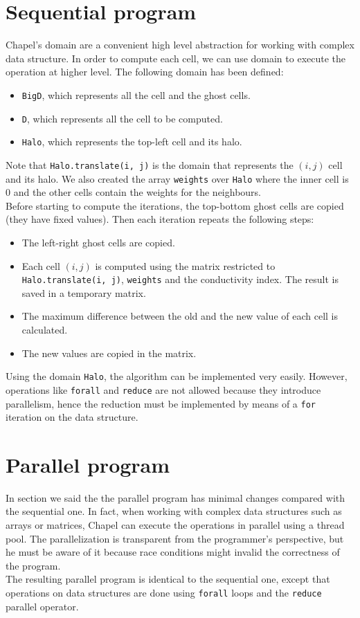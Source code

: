 \documentclass{article}
\begin{document}
\section{Sequential program}
Chapel's domain are a convenient high level abstraction for working with complex data structure. In order to compute each cell, we can use domain to execute the operation at higher level. The following domain has been defined:
\begin{itemize}
    \item \texttt{BigD}, which represents all the cell and the ghost cells.
    \item \texttt{D}, which represents all the cell to be computed.
    \item \texttt{Halo}, which represents the top-left cell and its halo.
\end{itemize}
Note that \texttt{Halo.translate(i, j)} is the domain that represents the $(i,j)$ cell and its halo. We also created the array \texttt{weights} over \texttt{Halo} where the inner cell is 0 and the other cells contain the weights for the neighbours. \\
Before starting to compute the iterations, the top-bottom ghost cells are copied (they have fixed values). Then each iteration repeats the following steps:
\begin{itemize}
    \item The left-right ghost cells are copied.
    \item Each cell $(i,j)$ is computed using the matrix restricted to \texttt{Halo.translate(i, j)}, \texttt{weights} and the conductivity index. The result is saved in a temporary matrix.
    \item The maximum difference between the old and the new value of each cell is calculated.
    \item The new values are copied in the matrix.
\end{itemize}
Using the domain \texttt{Halo}, the algorithm can be implemented very easily. However, operations like \texttt{forall} and \texttt{reduce} are not allowed because they introduce parallelism, hence the reduction must be implemented by means of a \texttt{for} iteration on the data structure.

\section{Parallel program}
In section  we said the the parallel program has minimal changes compared with the sequential one. In fact, when working with complex data structures such as arrays or matrices, Chapel can execute the operations in parallel using a thread pool. The parallelization is transparent from the programmer's perspective, but he must be aware of it because race conditions might invalid the correctness of the program. \\
The resulting parallel program is identical to the sequential one, except that operations on data structures are done using \texttt{forall} loops and the \texttt{reduce} parallel operator.
\end{document}
